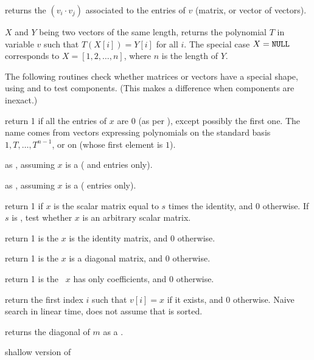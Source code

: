 returns the  $(v_i\cdot v_j)$
associated to the entries of $v$ (matrix, or vector of vectors).

 $X$ and $Y$ being two vectors of
the same length, returns the polynomial $T$ in variable $v$ such that
$T(X[i]) = Y[i]$ for all $i$. The special case $X = {\tt NULL}$
corresponds to $X = [1,2,\dots,n]$, where $n$ is the length of $Y$.


The following routines check whether matrices or vectors have a special
shape, using  and  to test components. (This makes
a difference when components are inexact.)

 return 1 if all the entries of $x$ are $0$
(as per ), except possibly the first one. The name comes from
vectors expressing polynomials on the standard basis $1,T,\dots, T^{n-1}$, or
on  (whose first element is $1$).

 as , assuming $x$ is a
 ( and  entries only).

 as , assuming $x$ is a
 ( entries only).

 return 1 if $x$ is the scalar matrix
equal to $s$ times the identity, and 0 otherwise. If $s$ is , test
whether $x$ is an arbitrary scalar matrix.

 return 1 is the  $x$ is the
identity matrix, and 0 otherwise.

 return 1 is the  $x$ is a
diagonal matrix, and 0 otherwise.

 return 1 is the ~$x$ has only
 coefficients, and 0 otherwise.

 return the first index $i$ such that
$v[i] = x$ if it exists, and $0$ otherwise. Naive search in linear time, does
not assume that  is sorted.

 returns the diagonal of $m$ as a .

 shallow version of 


